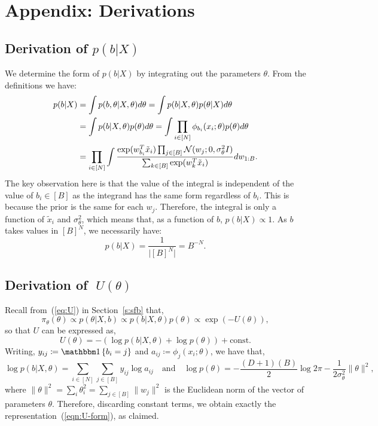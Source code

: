 \section{Appendix: Derivations}

\subsection{Derivation of {\boldmath $p(b|X)$}}
\label{appdx:b|x}

We determine the form of $p(b| X)$ by integrating
out the parameters $\theta$. From the definitions we have:
%
\begin{align*}
	p(b | X) &= \int p(b , \theta| X, \theta) d\theta = \int p(b | X, \theta) p(\theta | X) d\theta \\
	&=\int p(b | X, \theta) p(\theta) d\theta = \int \prod_{i \in [N] } \phi_{b_i}(x_i; \theta) p(\theta) d\theta \\
	&= \prod_{i \in [N]} \int \frac{\exp(w_{b_i}^T \tilde{x}_i) \prod_{j \in [B]} \mathcal{N}(w_j; 0, \sigma_\theta^2 I)}{\sum_{k \in [B]} \exp(w_{k}^T \tilde{x}_i)} dw_{1:B}.
\end{align*}
%
The key observation here is that 
the value of the integral is independent
of the value of $b_i \in [B]$ as
the integrand has the same form regardless of $b_i$. This is
because the prior is the same for each $w_j$. 
Therefore, the integral is only a function of $\tilde{x}_i$ and $\sigma_\theta^2$,
which means that, as a function of $b$, $p(b|X)\propto 1$. As
$b$ takes values in $[B]^N$, we necessarily have:
%
\begin{equation}
	p(b | X) = \frac{1}{\big|[B]^N\big|}=B^{-N}.
\end{equation}

\subsection{Derivation of {\boldmath $\;U(\theta)$}}
\label{appdx:form-U}

Recall from~(\ref{eq:U}) in Section~\ref{s:sfb} that,
$$	\pi_\theta(\theta) \propto p(\theta | X, b) \propto p(b | X, \theta) p(\theta) \propto  \exp \left( - U(\theta) \right),
$$ 
so that $U$ can be expressed as,
$$
U(\theta) 
= - \left( \log p(b | X, \theta) + \log p(\theta) \right) + \textrm{const}.
$$
Writing,
$y_{ij} \coloneqq \one \left\{ b_i = j \right\}$ and 
$a_{ij} \coloneqq \phi_j(x_i; \theta)$, we have that,
%
\begin{equation}
	\log p(b | X, \theta) = \sum_{i \in [N]} \sum_{j \in [B]} y_{ij} \log a_{ij}  \quad \textrm{and} \quad
	\log p(\theta) = -\frac{(D+1)(B)}{2} \log 2\pi - \frac{1}{2 \sigma_\theta^2} 
	\|\theta \|^2,
	\label{eqn:U-constituent-terms}
\end{equation}
%
where
$\|\theta\|^2 = \sum_{i} \theta_{i}^2 = \sum_{j \in [B]} \|w_j\|^2$ 
is the Euclidean norm of the vector of parameters $\theta$.
Therefore, discarding constant terms, we 
obtain exactly the representation~(\ref{eqn:U-form}), as claimed.

